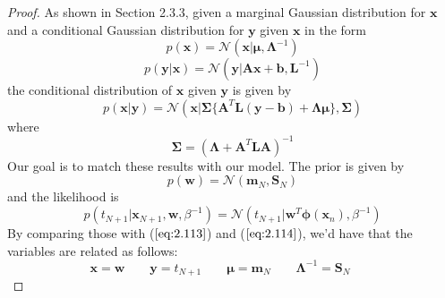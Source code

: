 \begin{proof}
    As shown in Section 2.3.3, given a marginal Gaussian distribution for 
    $\mathbf{x}$ and a conditional Gaussian distribution for $\mathbf{y}$
    given $\mathbf{x}$ in the form
    \begin{equation*}
        p(\mathbf{x}) = \mathcal{N}(\mathbf{x} | \bm{\mu}, \mathbf{\Lambda}^{-1})
        \tag{2.113}\label{eq:2.113}
    \end{equation*}
    \vspace{-1em}
    \begin{equation*}
        p(\mathbf{y} | \mathbf{x}) 
        = \mathcal{N}(\mathbf{y} | \mathbf{Ax} + \mathbf{b}, \mathbf{L}^{-1})
        \tag{2.114}\label{eq:2.114}
    \end{equation*}
    the conditional distribution of $\mathbf{x}$ given $\mathbf{y}$ is given
    by
    \begin{equation*}
        p(\mathbf{x} | \mathbf{y}) 
        = \mathcal{N}(\mathbf{x} | \mathbf{\Sigma}
            \{\mathbf{A}^T\mathbf{L}(\mathbf{y} - \mathbf{b}) + \mathbf{\Lambda}\bm{\mu}\}, \mathbf{\Sigma})
        \tag{2.116}\label{eq:2.116}
    \end{equation*}
    where
    \begin{equation*}
        \mathbf{\Sigma} = (\mathbf{\Lambda} + \mathbf{A}^T\mathbf{L}\mathbf{A})^{-1}
        \tag{2.117}\label{eq:2.117}
    \end{equation*}
    Our goal is to match these results with our model.
    The prior is given by
    \begin{equation*}
        p(\mathbf{w}) = \mathcal{N}(\mathbf{m}_N, \mathbf{S}_N)
    \end{equation*}
    and the likelihood is
    \begin{equation*}
        p(t_{N + 1} | \mathbf{x}_{N + 1}, \mathbf{w}, \beta^{-1}) 
        = \mathcal{N}(t_{N + 1} | \mathbf{w}^T\bm{\phi}(\mathbf{x}_n), \beta^{-1})
    \end{equation*}
    By comparing those with ($\ref{eq:2.113}$) and ($\ref{eq:2.114}$), we'd have that
    the variables are related as follows: 
    \begin{equation*}
        \mathbf{x} = \mathbf{w}
        \hspace{2em}
        \mathbf{y} = t_{N + 1}
        \hspace{2em}
        \bm{\mu} = \mathbf{m}_N
        \hspace{2em}
        \mathbf{\Lambda}^{-1} = \mathbf{S}_N
        \hspace{2em}

\end{equation*}
\end{proof}
